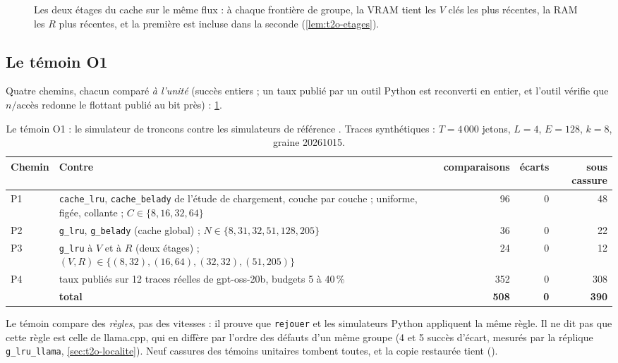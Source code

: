 \begin{figure}[ht]
\centering
\SchemaCchEtages
\caption[Les deux étages du cache]{Les deux étages du cache sur le même flux : à chaque frontière de groupe, la VRAM tient les $V$ clés les plus récentes, la RAM les $R$ plus récentes, et la première est incluse dans la seconde (\cref{lem:t2o-etages}).}
\label{fig:t2o-etages}
\end{figure}

\subsection{Le témoin O1}

Quatre chemins, chacun comparé \emph{à l'unité} (succès entiers ; un taux publié par un outil Python est reconverti en entier, et l'outil vérifie que $n/\text{accès}$ redonne le flottant publié au bit près) : \cref{tab:t2o-o1}.

\begin{table}[ht]
\centering\small
\caption[Le témoin O1]{Le témoin O1 : le simulateur de troncons contre les simulateurs de référence \mes. Traces synthétiques : $T = 4\,000$ jetons, $L = 4$, $E = 128$, $k = 8$, graine 20261015.}
\label{tab:t2o-o1}
\begin{tabularx}{\linewidth}{@{}lXrrr@{}}
\toprule
Chemin & Contre & comparaisons & écarts & sous cassure \\
\midrule
P1 & \texttt{cache\_lru}, \texttt{cache\_belady} de l'étude de chargement, couche par couche ; uniforme, figée, collante ; $C \in \{8, 16, 32, 64\}$ & 96 & 0 & 48 \\
P2 & \texttt{g\_lru}, \texttt{g\_belady} (cache global) ; $N \in \{8, 31, 32, 51, 128, 205\}$ & 36 & 0 & 22 \\
P3 & \texttt{g\_lru} à $V$ et à $R$ (deux étages) ; $(V, R) \in \{(8, 32), (16, 64), (32, 32), (51, 205)\}$ & 24 & 0 & 12 \\
P4 & taux publiés sur 12 traces réelles de gpt-oss-20b, budgets 5 à 40\,\% & 352 & 0 & 308 \\
\midrule
 & \textbf{total} & \textbf{508} & \textbf{0} & \textbf{390} \\
\bottomrule
\end{tabularx}
\end{table}

Le témoin compare des \emph{règles}, pas des vitesses : il prouve que \texttt{rejouer} et les simulateurs Python appliquent la même règle. Il ne dit pas que cette règle est celle de llama.cpp, qui en diffère par l'ordre des défauts d'un même groupe (4 et 5 succès d'écart, mesurés par la réplique \texttt{g\_lru\_llama}, \cref{sec:t2o-localite}). Neuf cassures des témoins unitaires tombent toutes, et la copie restaurée tient ().


